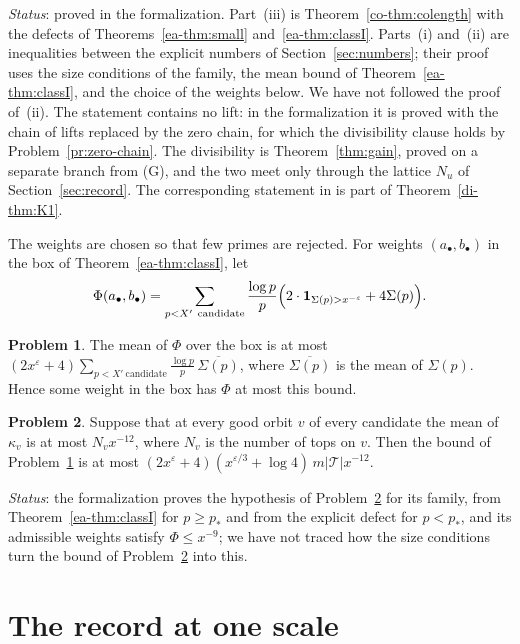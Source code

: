 \documentclass[reqno]{amsart}
\theoremstyle{definition}
\newtheorem{problem}{Problem}[section]
\theoremstyle{plain}
\theoremstyle{remark}
\newcommand{\Tc}{\mathcal T}
\begin{document}
\noindent\emph{Status}: proved in the formalization.  Part~(iii) is Theorem~\ref{co-thm:colength} with the defects of Theorems~\ref{ea-thm:small} and~\ref{ea-thm:classI}.  Parts~(i) and~(ii) are inequalities between the explicit numbers of Section~\ref{sec:numbers}; their proof uses the size conditions of the family, the mean bound of Theorem~\ref{ea-thm:classI}, and the choice of the weights below.  We have not followed the proof of~(ii).  The statement contains no lift: in the formalization it is proved with the chain of lifts replaced by the zero chain, for which the divisibility clause holds by Problem~\ref{pr:zero-chain}.  The divisibility is Theorem~\ref{thm:gain}, proved on a separate branch from (G), and the two meet only through the lattice \(N_u\) of Section~\ref{sec:record}.  The corresponding statement in \cite{Adr} is part of Theorem~\ref{di-thm:K1}.

The weights are chosen so that few primes are rejected.  For weights \((a_\bullet,b_\bullet)\) in the box of Theorem~\ref{ea-thm:classI}, let
\[
 \Phi(a_\bullet,b_\bullet)=\sum_{p<X'\ \text{candidate}}\frac{\log p}p\Bigl(2\cdot\mathbf 1_{\Sigma(p)>x^{-\varepsilon}}+4\Sigma(p)\Bigr).
\]

\begin{problem}\label{pr:markov}
The mean of \(\Phi\) over the box is at most \((2x^\varepsilon+4)\sum_{p<X'\ \text{candidate}}\frac{\log p}p\,\overline{\Sigma(p)}\), where \(\overline{\Sigma(p)}\) is the mean of \(\Sigma(p)\).  Hence some weight in the box has \(\Phi\) at most this bound.
\end{problem}

\begin{problem}\label{pr:mean-bound}
Suppose that at every good orbit \(v\) of every candidate the mean of \(\kappa_v\) is at most \(N_vx^{-12}\), where \(N_v\) is the number of tops on \(v\).  Then the bound of Problem~\ref{pr:markov} is at most \((2x^\varepsilon+4)(x^{\varepsilon/3}+\log4)\,m\lvert\Tc\rvert x^{-12}\).
\end{problem}

\noindent\emph{Status}: the formalization proves the hypothesis of Problem~\ref{pr:mean-bound} for its family, from Theorem~\ref{ea-thm:classI} for \(p\ge p_*\) and from the explicit defect for \(p<p_*\), and its admissible weights satisfy \(\Phi\le x^{-9}\); we have not traced how the size conditions turn the bound of Problem~\ref{pr:mean-bound} into this.

\section{The record at one scale}\label{sec:scale}
\end{document}
